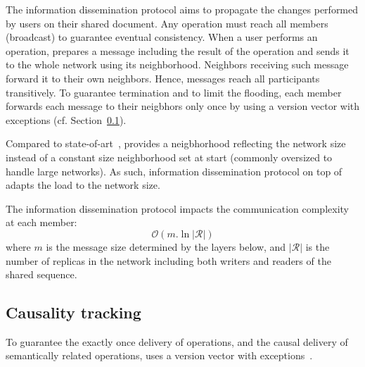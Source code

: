 \begin{asparadesc}
\item [The information dissemination protocol]\cite{birman1999bimodal} aims to
  propagate the changes performed by users on their shared document. Any
  operation must reach all members (broadcast) to guarantee eventual
  consistency.  When a user performs an operation, \CRATE prepares a message
  including the result of the operation and sends it to the whole network using
  its neighborhood. Neighbors receiving such message forward it to their own
  neighbors. Hence, messages reach all participants transitively. To guarantee
  termination and to limit the flooding, each member forwards each message to
  their neigbhors only once by using a version vector with exceptions
  (cf. Section~\ref{subsec:causality}).

  Compared to state-of-art~\cite{ganesh2003peer, jelasity2007gossip,
    voulgaris2005cyclon}, \SPRAY provides a neigbhorhood reflecting the network
  size instead of a constant size neighborhood set at start (commonly oversized
  to handle large networks). As such, information dissemination protocol on top
  of \SPRAY adapts the load to the network size.

  The information dissemination protocol impacts the communication complexity at
  each member:
  \begin{equation}
    \mathcal{O}(m.\ln |\mathcal{R}|)
  \end{equation}
  where $m$ is the message size determined by the layers below, and
  $|\mathcal{R}|$ is the number of replicas in the network including both
  writers and readers of the shared sequence.
\end{asparadesc}

\subsection{Causality tracking}
\label{subsec:causality}

To guarantee the exactly once delivery of operations, and the causal delivery of
semantically related operations, \CRATE uses a version vector with
exceptions~\cite{malkhi2007concise, mukund2014optimized}.

